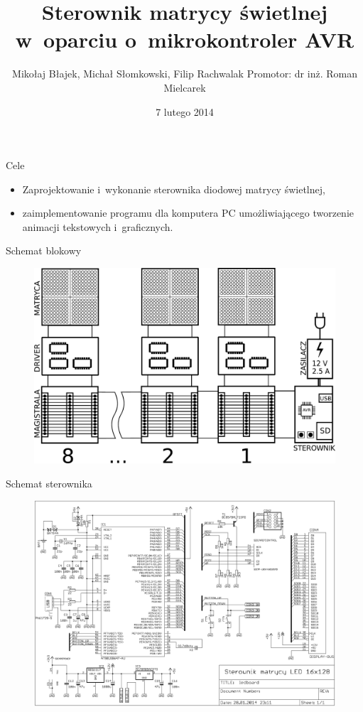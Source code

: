 \documentclass{beamer}
\title[Tablica LED]{Sterownik matrycy świetlnej w~oparciu o~mikrokontroler AVR}
\author{Mikołaj Błajek, Michał Słomkowski, Filip Rachwalak \newline \newline Promotor: dr inż.  Roman Mielcarek}
\institute{Politechnika Poznańska}
\date{7 lutego 2014}
\begin{document}
\begin{frame}
	\titlepage
\end{frame}

\begin{frame}
	\begin{block}{Cele}
		\begin{itemize}
			\item Zaprojektowanie i~wykonanie sterownika diodowej matrycy świetlnej,
			\item zaimplementowanie programu dla komputera PC umożliwiającego tworzenie animacji tekstowych i~graficznych.
		\end{itemize}
	\end{block}
\end{frame}

% 
\begin{frame}{Schemat blokowy}
	\begin{figure}[h]
		\centering
		\includegraphics[width=\textwidth]{img/blokowy.pdf}
	\end{figure}
\end{frame}

% 
\begin{frame}{Schemat sterownika}
	\begin{figure}[h]
		\centering
		\includegraphics[width=\textwidth]{img/schemat.pdf}
	\end{figure}
\end{frame}
\end{document}
